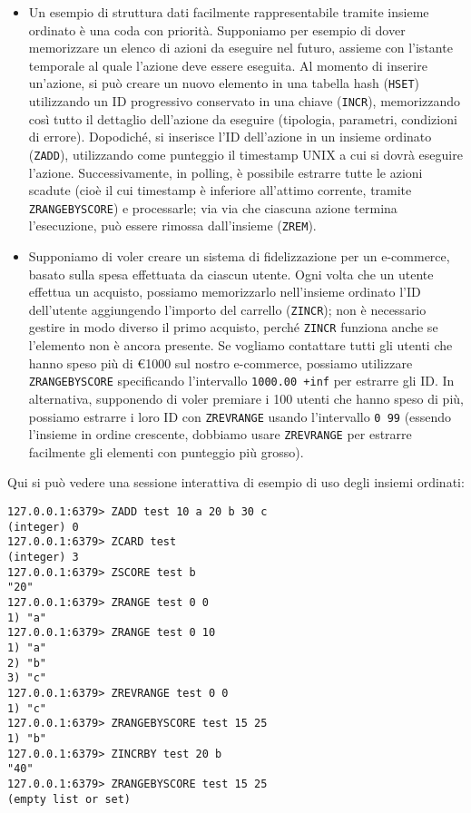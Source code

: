 \begin{itemize}
	\medskip

	\item Un esempio di struttura dati facilmente rappresentabile tramite insieme ordinato è una
	coda con priorità. Supponiamo per esempio di dover memorizzare un elenco di azioni da eseguire
	nel futuro, assieme con l'istante temporale al quale l'azione deve essere eseguita. Al momento
	di inserire un'azione, si può creare un nuovo elemento in una tabella hash (\verb|HSET|)
	utilizzando un ID progressivo conservato in una chiave (\verb|INCR|), memorizzando così tutto
	il dettaglio dell'azione da eseguire (tipologia, parametri, condizioni di errore). Dopodiché,
	si inserisce l'ID dell'azione in un insieme ordinato (\verb|ZADD|), utilizzando come punteggio
	il timestamp UNIX a cui si dovrà eseguire l'azione. Successivamente, in polling, è possibile
	estrarre tutte le azioni scadute (cioè il cui timestamp è inferiore all'attimo corrente,
	tramite \verb|ZRANGEBYSCORE|) e processarle; via via che ciascuna azione termina l'esecuzione,
	può essere rimossa dall'insieme (\verb|ZREM|).

	\item Supponiamo di voler creare un sistema di fidelizzazione per un e-commerce, basato sulla
	spesa effettuata da ciascun utente. Ogni volta che un utente effettua un acquisto, possiamo
	memorizzarlo nell'insieme ordinato l'ID dell'utente aggiungendo l'importo del carrello
	(\verb|ZINCR|); non è necessario gestire in modo diverso il primo acquisto, perché \verb|ZINCR|
	funziona anche se l'elemento non è ancora presente. Se vogliamo contattare tutti gli utenti che
	hanno speso più di €1000 sul nostro e-commerce, possiamo utilizzare \verb|ZRANGEBYSCORE|
	specificando l'intervallo \verb|1000.00 +inf| per estrarre gli ID. In alternativa, supponendo di
	voler premiare i 100 utenti che hanno speso di più, possiamo estrarre i loro ID con
	\verb|ZREVRANGE| usando l'intervallo \verb|0 99| (essendo l'insieme in ordine crescente,
	dobbiamo usare \verb|ZREVRANGE| per estrarre facilmente gli elementi con punteggio più grosso).
\end{itemize}

Qui si può vedere una sessione interattiva di esempio di uso degli insiemi ordinati:

\medskip
\begin{lstlisting}
127.0.0.1:6379> ZADD test 10 a 20 b 30 c
(integer) 0
127.0.0.1:6379> ZCARD test
(integer) 3
127.0.0.1:6379> ZSCORE test b
"20"
127.0.0.1:6379> ZRANGE test 0 0
1) "a"
127.0.0.1:6379> ZRANGE test 0 10
1) "a"
2) "b"
3) "c"
127.0.0.1:6379> ZREVRANGE test 0 0
1) "c"
127.0.0.1:6379> ZRANGEBYSCORE test 15 25
1) "b"
127.0.0.1:6379> ZINCRBY test 20 b
"40"
127.0.0.1:6379> ZRANGEBYSCORE test 15 25
(empty list or set)
\end{lstlisting}



